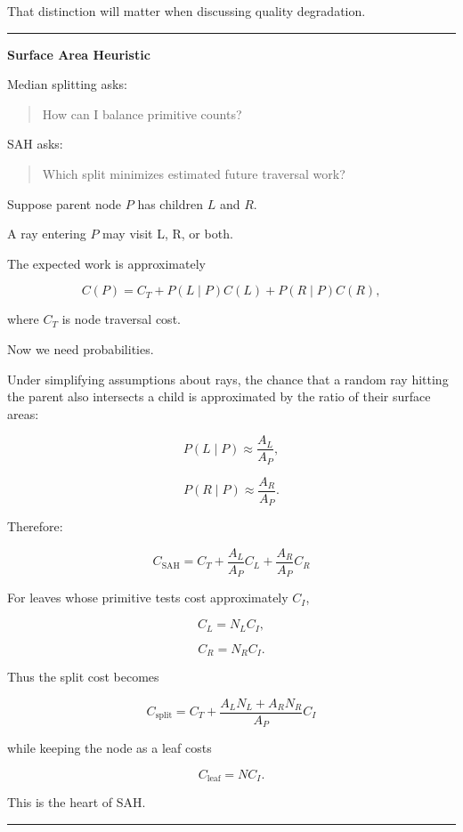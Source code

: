 That distinction will matter when discussing quality degradation.

\begin{center}\rule{0.5\linewidth}{0.5pt}\end{center}

\textbf{Surface Area Heuristic}

Median splitting asks:

\begin{quote}
How can I balance primitive counts?
\end{quote}

SAH asks:

\begin{quote}
Which split minimizes estimated future traversal work?
\end{quote}

Suppose parent node \(P\) has children \(L\) and \(R\).

A ray entering \(P\) may visit L, R, or both.

The expected work is approximately

\[
C(P)=
C_T
+
P(L\mid P)C(L)
+
P(R\mid P)C(R),
\]

where \(C_T\) is node traversal cost.

Now we need probabilities.

Under simplifying assumptions about rays, the chance that a random ray hitting the parent also intersects a child is approximated by the ratio of their surface areas:

\[
P(L\mid P)
\approx
\frac{A_L}{A_P},
\]

\[
P(R\mid P)
\approx
\frac{A_R}{A_P}.
\]

Therefore:

\[
\boxed{
C_{\text{SAH}}
=
C_T+
\frac{A_L}{A_P}C_L+
\frac{A_R}{A_P}C_R
}
\]

For leaves whose primitive tests cost approximately \(C_I\),

\[
C_L=N_LC_I,
\]

\[
C_R=N_RC_I.
\]

Thus the split cost becomes

\[
\boxed{
C_{\text{split}}
=
C_T+
\frac{
A_LN_L+A_RN_R
}{
A_P
}
C_I
}
\]

while keeping the node as a leaf costs

\[
\boxed{
C_{\text{leaf}}=NC_I.
}
\]

This is the heart of SAH.

\begin{center}\rule{0.5\linewidth}{0.5pt}\end{center}

